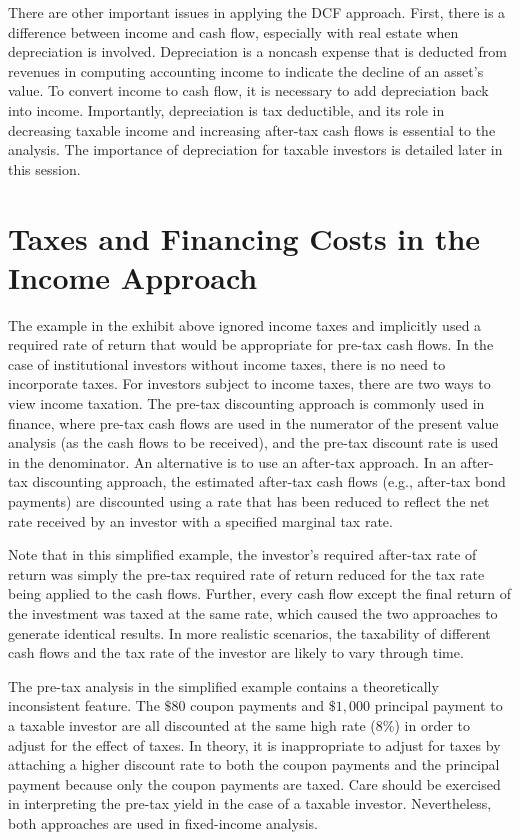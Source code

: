 \documentclass[11pt]{article}
\begin{document}
There are other important issues in applying the DCF approach. First, there is a difference between income and cash flow, especially with real estate when depreciation is involved. Depreciation is a noncash expense that is deducted from revenues in computing accounting income to indicate the decline of an asset's value. To convert income to cash flow, it is necessary to add depreciation back into income. Importantly, depreciation is tax deductible, and its role in decreasing taxable income and increasing after-tax cash flows is essential to the analysis. The importance of depreciation for taxable investors is detailed later in this session.

\section*{Taxes and Financing Costs in the Income Approach}
The example in the exhibit above ignored income taxes and implicitly used a required rate of return that would be appropriate for pre-tax cash flows. In the case of institutional investors without income taxes, there is no need to incorporate taxes. For investors subject to income taxes, there are two ways to view income taxation. The pre-tax discounting approach is commonly used in finance, where pre-tax cash flows are used in the numerator of the present value analysis (as the cash flows to be received), and the pre-tax discount rate is used in the denominator. An alternative is to use an after-tax approach. In an after-tax discounting approach, the estimated after-tax cash flows (e.g., after-tax bond payments) are discounted using a rate that has been reduced to reflect the net rate received by an investor with a specified marginal tax rate.

Note that in this simplified example, the investor's required after-tax rate of return was simply the pre-tax required rate of return reduced for the tax rate being applied to the cash flows. Further, every cash flow except the final return of the investment was taxed at the same rate, which caused the two approaches to generate identical results. In more realistic scenarios, the taxability of different cash flows and the tax rate of the investor are likely to vary through time.

The pre-tax analysis in the simplified example contains a theoretically inconsistent feature. The $\$ 80$ coupon payments and $\$ 1,000$ principal payment to a taxable investor are all discounted at the same high rate (8\%) in order to adjust for the effect of taxes. In theory, it is inappropriate to adjust for taxes by attaching a higher discount rate to both the coupon payments and the principal payment because only the coupon payments are taxed. Care should be exercised in interpreting the pre-tax yield in the case of a taxable investor. Nevertheless, both approaches are used in fixed-income analysis.
\end{document}
